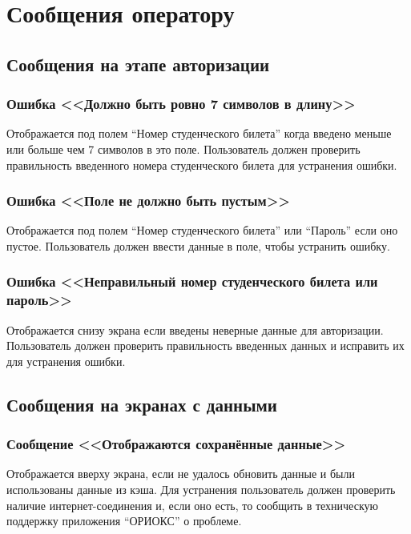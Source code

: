 \chapter{Сообщения оператору}
\label{ch:messages}

\section{Сообщения на этапе авторизации}
\label{sec:massages:auth}

\subsection*{Ошибка <<Должно быть ровно 7 символов в длину>>}
Отображается под полем ``Номер студенческого билета'' когда введено меньше или больше чем 7 символов в это поле.
Пользователь должен проверить правильность введенного номера студенческого билета для устранения ошибки.

\subsection*{Ошибка <<Поле не должно быть пустым>>}
Отображается под полем ``Номер студенческого билета'' или ``Пароль'' если оно пустое.
Пользователь должен ввести данные в поле, чтобы устранить ошибку.

\subsection*{Ошибка <<Неправильный номер студенческого билета или пароль>>}
Отображается снизу экрана если введены неверные данные для авторизации.
Пользователь должен проверить правильность введенных данных и исправить их для устранения ошибки.

\section{Сообщения на экранах с данными}
\label{sec:messages:data}

\subsection*{Сообщение <<Отображаются сохранённые данные>>}
Отображается вверху экрана, если не удалось обновить данные и были использованы данные из кэша.
Для устранения пользователь должен проверить наличие интернет-соединения и, если оно есть, то сообщить в техническую поддержку приложения ``ОРИОКС'' о проблеме.

